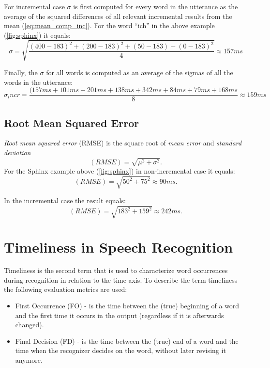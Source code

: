 For incremental case $\sigma$ is first computed for every word in the utterance
as the average of the squared differences of all relevant incremental results from
the mean (\ref{eq:mean_comp_inc}). For the word ``ich'' in the above example (\ref{fig:sphinx}) it equals:
\begin{equation} \sigma=\sqrt {\frac
{(400-183)^2+(200-183)^2+(50-183)+(0-183)^2}{4}}\approx 157 ms
\end{equation}

Finally, the $\sigma$ for all words is computed as an average of the sigmas of
all the words in the utterance:
\begin{equation} \sigma_incr=\frac
{(157 ms+101 ms + 201 ms+138 ms+342 ms+ 84ms +79ms +168 ms}{8}\approx 159
ms
\end{equation}


\subsection {Root Mean Squared Error}
\textit {Root mean squared error} (RMSE) is the square root of  \textit {mean
error}  and \textit {standard deviation} \begin{equation} (RMSE)=\sqrt
{\mu^2+\sigma^2}. 
\end{equation}
For the Sphinx example above  (\ref{fig:sphinx}) in  non-incremental case it
equals:
\begin{equation} (RMSE)=\sqrt
{50^2+75^2} \approx 90 ms. 
\end{equation}

In the incremental case the result equals:
\begin{equation} (RMSE)=\sqrt
{183^2+159^2} \approx 242 ms. 
\end{equation}



\section {Timeliness in Speech Recognition} 
Timeliness is the second term that is used to characterize word
occurrences during recognition in relation to the time axis. 
To describe the term timeliness the following evaluation metrics are used:
\begin{itemize}
  \item First Occurrence (FO) - is the time between the (true) beginning of a
  word and the first time it occurs in the output (regardless if it is afterwards changed).
\item Final Decision (FD) - is the time between the (true) end of a word and the
time when the recognizer decides on the word, without later revising it anymore.
\end{itemize}

